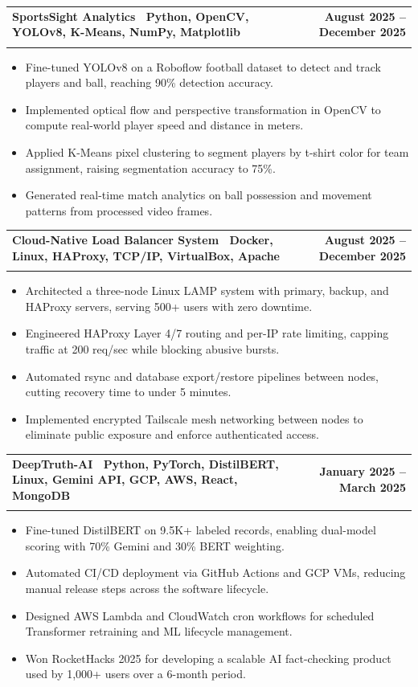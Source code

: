 \documentclass[letterpaper,11pt]{article}
\makeatletter
\newcommand{\resumeItem}[1]{\item\small{#1 \vspace{-4pt}}}
\newcommand{\resumeSubheading}[4]{
    \vspace{-2pt}\item
    \begin{tabular*}{1.0\textwidth}[t]{l@{\extracolsep{\fill}}r}
        \textbf{#1} & \textbf{\small #2} \\
        \textit{\small#3} & \textit{\small #4}
    \end{tabular*}\vspace{-7pt}
}
\newcommand{\resumeItemListStart}{\begin{itemize}}
\newcommand{\resumeItemListEnd}{\end{itemize}\vspace{-7pt}}
\makeatother
\begin{document}
\resumeSubheading
{\textbf{SportsSight Analytics} \textnormal{\textbar\ {Python, OpenCV, YOLOv8, K-Means, NumPy, Matplotlib}}}{August 2025 -- December 2025}{}{}
\vspace{-0.6cm}
\resumeItemListStart
\resumeItem{Fine-tuned YOLOv8 on a Roboflow football dataset to detect and track players and ball, reaching 90\% detection accuracy.}
\vspace{0.15cm}
\resumeItem{Implemented optical flow and perspective transformation in OpenCV to compute real-world player speed and distance in meters.}
\vspace{0.15cm}
\resumeItem{Applied K-Means pixel clustering to segment players by t-shirt color for team assignment, raising segmentation accuracy to 75\%.}
\vspace{0.15cm}
\resumeItem{Generated real-time match analytics on ball possession and movement patterns from processed video frames.}
\vspace{0.15cm}
\resumeItemListEnd

\resumeSubheading
{\textbf{Cloud-Native Load Balancer System} \textnormal{\textbar\ {Docker, Linux, HAProxy, TCP/IP, VirtualBox, Apache}}}{August 2025 -- December 2025}{}{}
\vspace{-0.6cm}
\resumeItemListStart
\resumeItem{Architected a three-node Linux LAMP system with primary, backup, and HAProxy servers, serving 500+ users with zero downtime.}
\vspace{0.15cm}
\resumeItem{Engineered HAProxy Layer 4/7 routing and per-IP rate limiting, capping traffic at 200 req/sec while blocking abusive bursts.}
\vspace{0.15cm}
\resumeItem{Automated rsync and database export/restore pipelines between nodes, cutting recovery time to under 5 minutes.}
\vspace{0.15cm}
\resumeItem{Implemented encrypted Tailscale mesh networking between nodes to eliminate public exposure and enforce authenticated access.}
\vspace{0.15cm}
\resumeItemListEnd

\resumeSubheading
{\textbf{DeepTruth-AI} \textnormal{\textbar\ {Python, PyTorch, DistilBERT, Linux, Gemini API, GCP, AWS, React, MongoDB}}}{January 2025 -- March 2025}{}{}
\vspace{-0.6cm}
\resumeItemListStart

\resumeItem{Fine-tuned DistilBERT on 9.5K+ labeled records, enabling dual-model scoring with 70\% Gemini and 30\% BERT weighting.}
\vspace{0.15cm}
\resumeItem{Automated CI/CD deployment via GitHub Actions and GCP VMs, reducing manual release steps across the software lifecycle.}
\vspace{0.15cm}
\resumeItem{Designed AWS Lambda and CloudWatch cron workflows for scheduled Transformer retraining and ML lifecycle management.}
\vspace{0.15cm}
\resumeItem{Won RocketHacks 2025 for developing a scalable AI fact-checking product used by 1,000+ users over a 6-month period.}
\vspace{0.15cm}
\resumeItemListEnd
\end{document}
